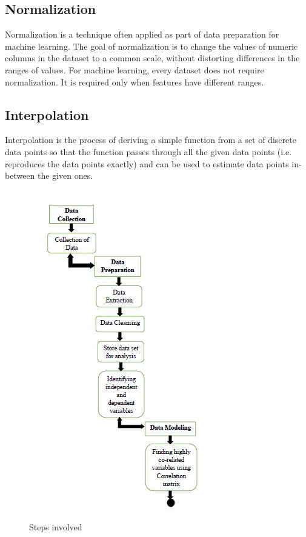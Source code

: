 \subsection{Normalization}
Normalization is a technique often applied as part of data preparation for machine learning. The goal of normalization is to change the values of numeric columns in the dataset to a common scale, without distorting differences in the ranges of values. For machine learning, every dataset does not require normalization. It is required only when features have different ranges.


\subsection{Interpolation }
Interpolation is the process of deriving a simple function from a set of discrete data points so that the function passes through all the given data points (i.e. reproduces the data points exactly) and can be used to estimate data points in-between the given ones.



\begin{figure}[h]
\label{bd}
\centering
\includegraphics[width= 14 cm]{de3.jpeg}
\caption{Steps involved}
\end{figure}


